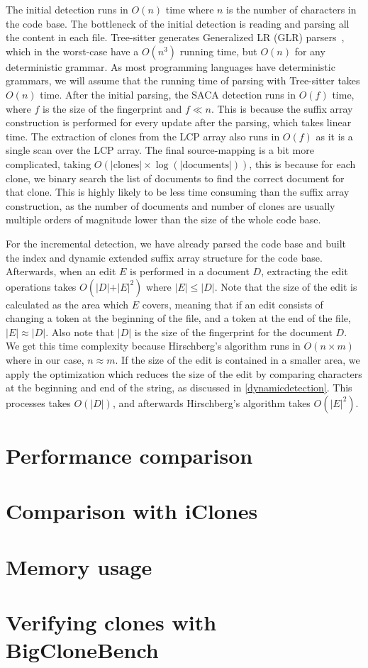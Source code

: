 The initial detection runs in $O(n)$ time where $n$ is the number of characters in the
code base. The bottleneck of the initial detection is reading and parsing all the content
in each file. Tree-sitter generates Generalized LR (GLR) parsers~\cite{GLR}, which in the
worst-case have a $O(n^3)$ running time, but $O(n)$ for any deterministic grammar. As most
programming languages have deterministic grammars, we will assume that the running time of
parsing with Tree-sitter takes $O(n)$ time. After the initial parsing, the SACA detection
runs in $O(f)$ time, where $f$ is the size of the fingerprint and $f \ll n$. This is
because the suffix array construction is performed for every update after the parsing,
which takes linear time. The extraction of clones from the LCP array also runs in $O(f)$
as it is a single scan over the LCP array. The final source-mapping is a bit more
complicated, taking $O(\vert\text{clones}\vert \times \log (\vert\text{documents}\vert))$,
this is because for each clone, we binary search the list of documents to find the correct
document for that clone. This is highly likely to be less time consuming than the suffix
array construction, as the number of documents and number of clones are usually multiple
orders of magnitude lower than the size of the whole code base.

For the incremental detection, we have already parsed the code base and built the index
and dynamic extended suffix array structure for the code base. Afterwards, when an edit
$E$ is performed in a document $D$, extracting the edit operations takes $O(\vert D\vert +
\vert E\vert^2)$ where $\vert E\vert \leq \vert D\vert$. Note that the size of the edit is
calculated as the area which $E$ covers, meaning that if an edit consists of changing a
token at the beginning of the file, and a token at the end of the file, $\vert E\vert
\approx \vert D\vert$. Also note that $\vert D\vert$ is the size of the fingerprint for
the document $D$. We get this time complexity because Hirschberg's algorithm runs in $O(n
\times m)$ where in our case, $n \approx m$. If the size of the edit is contained in a
smaller area, we apply the optimization which reduces the size of the edit by comparing
characters at the beginning and end of the string, as discussed in
\cref{dynamicdetection}. This processes takes $O(\vert D\vert)$, and afterwards
Hirschberg's algorithm takes $O(\vert E\vert^2)$.


\section{Performance comparison}


\section{Comparison with iClones}

\section{Memory usage}

\section{Verifying clones with BigCloneBench}
